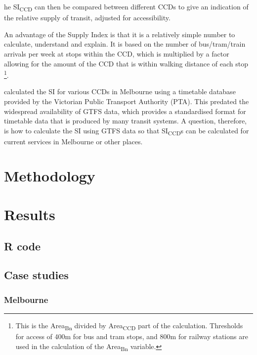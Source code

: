 \documentclass[numbered]{trbunofficial}
\begin{document}
he SI\textsubscript{CCD} can then be compared between different CCDs to
give an indication of the relative supply of transit, adjusted for
accessibility.

An advantage of the Supply Index is that it is a relatively simple
number to calculate, understand and explain. It is based on the number
of bus/tram/train arrivals per week at stops within the CCD, which is
multiplied by a factor allowing for the amount of the CCD that is within
walking distance of each stop \footnote{This is the
  Area\textsubscript{Bn} divided by Area\textsubscript{CCD} part of the
  calculation. Thresholds for access of 400m for bus and tram stops, and
  800m for railway stations are used in the calculation of the
  Area\textsubscript{Bn} variable.}.

\citet{currie2007identifying} calculated the SI for various CCDs in
Melbourne using a timetable database provided by the Victorian Public
Transport Authority (PTA). This predated the widespread availability of
GTFS data, which provides a standardised format for timetable data that
is produced by many transit systems. A question, therefore, is how to
calculate the SI using GTFS data so that SI\textsubscript{CCD}s can be
calculated for current services in Melbourne or other places.

\hypertarget{methodology}{%
\section{Methodology}\label{methodology}}

\hypertarget{results}{%
\section{Results}\label{results}}

\hypertarget{r-code}{%
\subsection{R code}\label{r-code}}

\hypertarget{case-studies}{%
\subsection{Case studies}\label{case-studies}}

\hypertarget{melbourne}{%
\subsubsection{Melbourne}\label{melbourne}}
\end{document}
